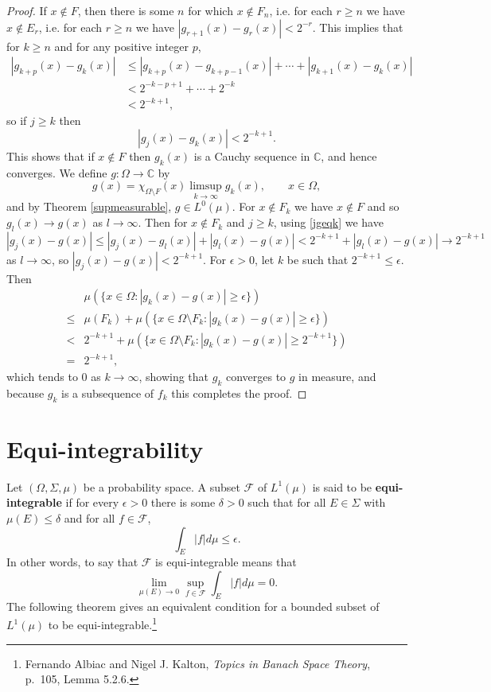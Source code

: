\documentclass{article}
\theoremstyle{definition}
\begin{document}
\begin{proof}
If $x \not \in F$, then there is some $n$ for which $x \not \in F_n$, i.e.
for each $r \geq n$ we have $x \not \in E_r$, i.e.
for each $r \geq n$ we have $|g_{r+1}(x)-g_r(x)| < 2^{-r}$. 
This implies that for $k \geq n$ and for any positive integer $p$,
\begin{align*}
|g_{k+p}(x)-g_k(x)| &\leq |g_{k+p}(x)-g_{k+p-1}(x)|
+ \cdots + |g_{k+1}(x)-g_k(x)|\\
&<2^{-k-p+1}+\cdots+2^{-k}\\
&<2^{-k+1},
\end{align*}
so if $j \geq k$ then
\begin{equation}
|g_j(x)-g_k(x)| < 2^{-k+1}.
\label{jgeqk}
\end{equation}
This shows that if $x \not \in F$ then $g_k(x)$ is a Cauchy sequence in $\mathbb{C}$, and hence converges.
We define $g:\Omega \to \mathbb{C}$
by
\[
g(x)=\chi_{\Omega \setminus F}(x) \limsup_{k \to \infty} g_k(x), \qquad x \in \Omega,
\]
and by Theorem \ref{supmeasurable}, $g \in L^0(\mu)$.
For $x \not \in F_k$ we have $x \not \in F$ and
so $g_l(x) \to g(x)$ as $l \to \infty$. Then for $x \not \in F_k$ and $j \geq k$, using \eqref{jgeqk} we have
\[
|g_j(x)-g(x)| \leq |g_j(x)-g_l(x)| + |g_l(x)-g(x)| < 2^{-k+1} + |g_l(x)-g(x)| \to 2^{-k+1}
\]
as $l \to \infty$,
so $|g_j(x)-g(x)| < 2^{-k+1}$. For $\epsilon>0$, let $k$ be such that $2^{-k+1}\leq \epsilon$. Then
\[
\begin{split}
&\mu(\{x \in \Omega: |g_k(x)-g(x)| \geq \epsilon\})\\
\leq& \mu(F_k)+
\mu(\{x \in \Omega \setminus F_k: |g_k(x)-g(x)| \geq \epsilon\})\\
<&2^{-k+1}
 + \mu(\{x \in \Omega \setminus F_k: |g_k(x)-g(x)| \geq 2^{-k+1}\})\\
=&2^{-k+1},
\end{split}
\]
which tends to $0$ as $k \to \infty$, showing that $g_k$ converges to $g$ in measure, and because $g_k$ is a subsequence of $f_k$ this
completes the proof.
\end{proof}



\section{Equi-integrability}
Let $(\Omega,\Sigma,\mu)$ be a probability  space. A subset $\mathscr{F}$ of $L^1(\mu)$ is said to be
\textbf{equi-integrable} if for every $\epsilon>0$ there is some $\delta>0$ such that for all
$E \in \Sigma$ with $\mu(E) \leq \delta$ and for all $f \in \mathscr{F}$,
\[
\int_E |f| d\mu  \leq \epsilon.
\]
In other words, to say that $\mathscr{F}$ is equi-integrable means that
\[
\lim_{\mu(E) \to 0} \sup_{f \in \mathscr{F}} \int_E |f| d\mu = 0.
\]
The following theorem gives an equivalent condition for a bounded subset of $L^1(\mu)$
to be equi-integrable.\footnote{Fernando Albiac and
Nigel J. Kalton, {\em Topics in Banach Space Theory}, p.~105, Lemma 5.2.6.}
\end{document}
